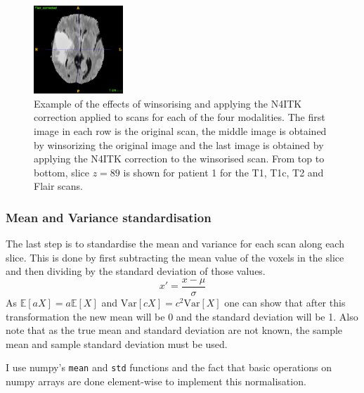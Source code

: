 \documentclass[12pt,a4paper,twoside,openright]{report}
\begin{document}
\begin{figure}
	\includegraphics[width=0.3\textwidth]{flair_n4itk_example}
	\caption{Example of the effects of winsorising and applying the N4ITK correction applied to scans for each of the four modalities. The first image in each row is the original scan, the middle image is obtained by winsorizing the original image and the last image is obtained by applying the N4ITK correction to the winsorised scan. From top to bottom, slice $z=89$ is shown for patient 1 for the T1, T1c, T2 and Flair scans.}
\end{figure}

\subsubsection{Mean and Variance standardisation}
The last step is to standardise the mean and variance for each scan along each slice. This is done by first subtracting the mean value of the voxels in the slice and then dividing by the standard deviation of those values. 
\begin{equation}
	x' = \frac{x - \mu}{\sigma}
\end{equation}
As $\mathbb{E}[aX] = a \mathbb{E}[X]$ and $\textrm{Var} [cX] = c^2 \textrm{Var} [X]$ one can show that after this transformation the new mean will be 0 and the standard deviation will be 1. Also note that as the true mean and standard deviation are not known, the sample mean and sample standard deviation must be used. 

I use numpy's \texttt{mean} and \texttt{std} functions and the fact that basic operations on numpy arrays are done element-wise to implement this normalisation.
\end{document}

